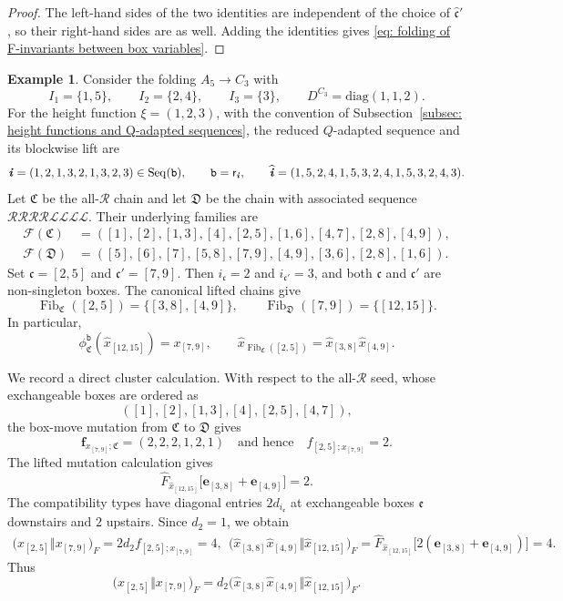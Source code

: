 \documentclass[12pt, leqno]{amsart}
\numberwithin{equation}{section}
\theoremstyle{plain}
\theoremstyle{definition}
\newtheorem{example}[lemma]{Example}
\newcommand{\ii}{ \textbf{\textit{i}}}
\newcommand{\Fib}{\operatorname{Fib}}
\newcommand{\hF}{\widehat{F}}
\newcommand{\hx}{\widehat{x}}
\newcommand{\hii}{{\widehat{\ii}}}
\newcommand{\frakC}{\mathfrak{C}}
\newcommand{\frakD}{\mathfrak{D}}
\newcommand{\frakc}{\mathfrak{c}}
\newcommand{\frake}{\mathfrak{e}}
\newcommand{\hfrakc}{\widehat{\frakc}}
\newcommand{\sfr}{\mathsf{r}}
\newcommand{\bff}{\mathbf{f}}
\newcommand{\calF}{\mathcal{F}}
\newcommand{\calL}{\mathcal{L}}
\newcommand{\calR}{\mathcal{R}}
\newcommand{\ttb}{\mathtt{b}}
\newcommand{\diag}{\mathrm{diag}}
\newcommand{\qtqh}[1][{and hence}]{\quad\text{{#1}}\quad}
\newcommand{\Seq}{\mathrm{Seq}}
\begin{document}
\begin{proof}
The left-hand sides of the two identities are independent of
the choice of \(\hfrakc'\), so their right-hand sides are as well.
Adding the identities gives
\eqref{eq: folding of F-invariants between box variables}.
\end{proof}


\begin{example}\label{ex: A5 C3 folding of F-invariants}
Consider the folding \(A_5\to C_3\) with
\[
I_1=\{1,5\},\qquad I_2=\{2,4\},\qquad I_3=\{3\},
\qquad D^{C_3}=\diag(1,1,2).
\]
For the height function \(\xi=(1,2,3)\), with the convention of
Subsection~\ref{subsec: height functions and Q-adapted sequences},
the reduced \(Q\)-adapted sequence and its blockwise lift are 
\[
\ii=(1,2,1,3,2,1,3,2,3)\in\Seq(\ttb),
\qquad
\ttb=\sfr_\ii,
\qquad
\hii=(1,5,2,4,1,5,3,2,4,1,5,3,2,4,3).
\]
Let \(\frakC\) be the all-\(\calR\) chain and let \(\frakD\) be the
chain with associated sequence
\(\calR\calR\calR\calR\calL\calL\calL\calL\).  Their underlying
families are
\[
\begin{aligned}
\calF(\frakC)
&=
([1],[2],[1,3],[4],[2,5],[1,6],[4,7],[2,8],[4,9]),\\
\calF(\frakD)
&=
([5],[6],[7],[5,8],[7,9],[4,9],[3,6],[2,8],[1,6]).
\end{aligned}
\]
Set $\frakc=[2,5]$ and $\frakc'=[7,9]$.
Then \(i_\frakc=2\) and \(i_{\frakc'}=3\), and both
\(\frakc\) and \(\frakc'\) are non-singleton boxes.  The canonical
lifted chains give
\[
\Fib_{\frakC}([2,5]) = \{[3,8],[4,9]\},
\qquad
\Fib_{\frakD}([7,9]) = \{[12,15]\}.
\]
In particular,
\[
\phi_{\frakC}^{\ttb}(\hx_{[12,15]}) = x_{[7,9]},
\qquad
\hx_{\Fib_{\frakC}([2,5])} = \hx_{[3,8]}\hx_{[4,9]}.
\]

We record a direct cluster calculation.  With respect to the
all-\(\calR\) seed, whose exchangeable boxes are ordered as
\[
([1],[2],[1,3],[4],[2,5],[4,7]),
\]
the box-move mutation from \(\frakC\) to \(\frakD\) gives
\[
\bff_{x_{[7,9]};\frakC} = (2,2,2,1,2,1) 
\qtqh
f_{[2,5];x_{[7,9]}}=2.
\]
The lifted mutation calculation gives
\[
\hF_{\hx_{[12,15]}}
\bigl[\mathbf e_{[3,8]}+\mathbf e_{[4,9]}\bigr]=2.
\]
The compatibility types have diagonal entries \(2d_{i_\frake}\) at exchangeable boxes \(\frake\) downstairs and \(2\) upstairs.  Since \(d_2=1\), we obtain
\[
\begin{aligned}
\bigl(x_{[2,5]}\Vert x_{[7,9]}\bigr)_F
=2d_2 f_{[2,5];x_{[7,9]}}
=4,\  \
\bigl(\hx_{[3,8]}\hx_{[4,9]}
\Vert\hx_{[12,15]}\bigr)_F
=\hF_{\hx_{[12,15]}}
  \bigl[2(\mathbf e_{[3,8]}+\mathbf e_{[4,9]})\bigr]
=4.
\end{aligned}
\]
Thus
\[
\bigl(x_{[2,5]}\Vert x_{[7,9]}\bigr)_F
=d_2\bigl(\hx_{[3,8]}\hx_{[4,9]}
\Vert\hx_{[12,15]}\bigr)_F.
\]
\end{example}
\end{document}
